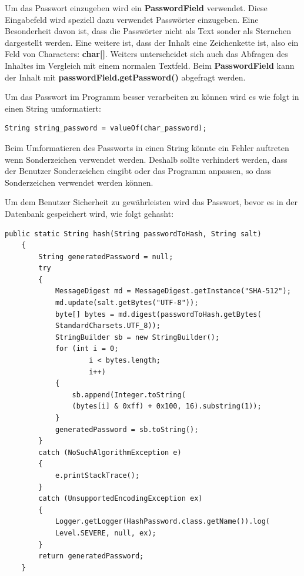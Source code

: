 \vspace{10pt}

Um das Passwort einzugeben wird ein \textbf{PasswordField} verwendet. Diese Eingabefeld wird speziell dazu verwendet Passwörter einzugeben. Eine Besonderheit davon ist, dass die Passwörter nicht als Text sonder als Sternchen dargestellt werden. Eine weitere ist, dass der Inhalt eine Zeichenkette ist, also ein Feld von Characters: \textbf{char[]}. Weiters unterscheidet sich auch das Abfragen des Inhaltes im Vergleich mit einem normalen Textfeld. Beim \textbf{PasswordField} kann der Inhalt mit \textbf{passwordField.getPassword()} abgefragt werden.

\newpage

Um das Passwort im Programm besser verarbeiten zu können wird es wie folgt in einen String umformatiert:
\begin{lstlisting}[style=Javastyle, caption=char zu String]
	String string_password = valueOf(char_password);
\end{lstlisting}
Beim Umformatieren des Passworts in einen String könnte ein Fehler auftreten wenn Sonderzeichen verwendet werden. Deshalb sollte verhindert werden, dass der Benutzer Sonderzeichen eingibt oder das Programm anpassen, so dass Sonderzeichen verwendet werden können.

\vspace{10pt}

Um dem Benutzer Sicherheit zu gewährleisten wird das Passwort, bevor es in der Datenbank gespeichert wird, wie folgt gehasht: 
\begin{lstlisting}[style=Javastyle, caption=Hash Passwort]
    public static String hash(String passwordToHash, String salt)
    {
        String generatedPassword = null;
        try
        {
            MessageDigest md = MessageDigest.getInstance("SHA-512");
            md.update(salt.getBytes("UTF-8"));
            byte[] bytes = md.digest(passwordToHash.getBytes(
            StandardCharsets.UTF_8));
            StringBuilder sb = new StringBuilder();
            for (int i = 0;
                    i < bytes.length;
                    i++)
            {
                sb.append(Integer.toString(
                (bytes[i] & 0xff) + 0x100, 16).substring(1));
            }
            generatedPassword = sb.toString();
        }
        catch (NoSuchAlgorithmException e)
        {
            e.printStackTrace();
        }
        catch (UnsupportedEncodingException ex)
        {
            Logger.getLogger(HashPassword.class.getName()).log(
            Level.SEVERE, null, ex);
        }
        return generatedPassword;
    }
\end{lstlisting}

